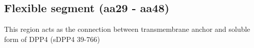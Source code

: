 \subsection{Flexible segment (aa29 - aa48)}

This region acts as the connection between transmembrane anchor and soluble form of DPP4 (sDPP4 39-766) 
